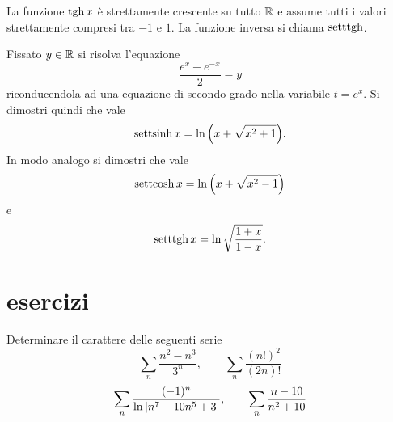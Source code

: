 La funzione $\operatorname{tgh} x$ è strettamente crescente su tutto ${\mathbb R}$ e assume tutti i valori strettamente compresi tra $-1$ e $1$.
La funzione inversa si chiama $\operatorname{setttgh}$.

\begin{exercise}
Fissato $y\in {\mathbb R}$ si risolva l'equazione
\[
    \frac{e^x - e^{-x}}{2} = y
\]
riconducendola ad una equazione di secondo grado nella variabile $t=e^x$.
Si dimostri quindi che vale
\[
    \operatorname{settsinh} x = \ln{\left( x + \sqrt{x^2 + 1} \right)}.
\]
In modo analogo si dimostri che vale
\[
    \operatorname{settcosh} x = \ln{\left( x + \sqrt{x^2 - 1} \right)}
\]
e
\[
    \operatorname{setttgh} x = \ln \sqrt{\frac{1+x}{1-x}}.
\]
\end{exercise}


\section{esercizi}
\begin{exercise}
Determinare il carattere delle seguenti serie
\[
    \sum_n \frac{n^2-n^3}{3^n}, \qquad
    \sum_n \frac{(n!)^2}{(2n)!}
\]
\[
\sum_n \frac{(-1)^n}{\ln{\left|n^7 - 10n^5 + 3\right|}},  \qquad
\sum_n \frac{n-10}{n^2+10}
\]
\end{exercise}
  
